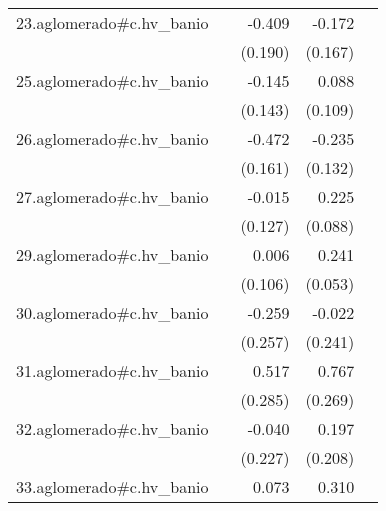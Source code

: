 {\begin{longtable}{l*{4}{D{.}{.}{-1}}}
\addlinespace
23.aglomerado#c.hv\_banio&                     &      -0.409\sym{*}  &      -0.172         &                     \\
            &                     &     (0.190)         &     (0.167)         &                     \\
\addlinespace
25.aglomerado#c.hv\_banio&                     &      -0.145         &       0.088         &                     \\
            &                     &     (0.143)         &     (0.109)         &                     \\
\addlinespace
26.aglomerado#c.hv\_banio&                     &      -0.472\sym{**} &      -0.235         &                     \\
            &                     &     (0.161)         &     (0.132)         &                     \\
\addlinespace
27.aglomerado#c.hv\_banio&                     &      -0.015         &       0.225\sym{*}  &                     \\
            &                     &     (0.127)         &     (0.088)         &                     \\
\addlinespace
29.aglomerado#c.hv\_banio&                     &       0.006         &       0.241\sym{***}&                     \\
            &                     &     (0.106)         &     (0.053)         &                     \\
\addlinespace
30.aglomerado#c.hv\_banio&                     &      -0.259         &      -0.022         &                     \\
            &                     &     (0.257)         &     (0.241)         &                     \\
\addlinespace
31.aglomerado#c.hv\_banio&                     &       0.517         &       0.767\sym{**} &                     \\
            &                     &     (0.285)         &     (0.269)         &                     \\
\addlinespace
32.aglomerado#c.hv\_banio&                     &      -0.040         &       0.197         &                     \\
            &                     &     (0.227)         &     (0.208)         &                     \\
\addlinespace
33.aglomerado#c.hv\_banio&                     &       0.073         &       0.310\sym{***}&                     \\

\end{longtable}}
